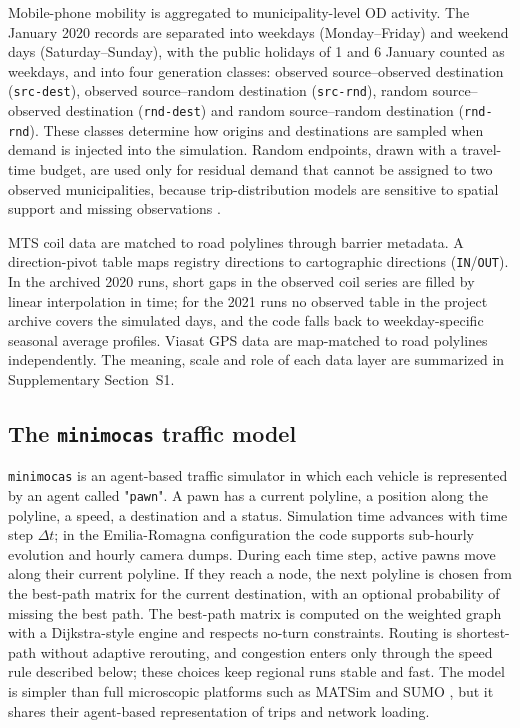 \documentclass[pdflatex,Numbered]{sn-jnl}
\begin{document}
Mobile-phone mobility is aggregated to municipality-level OD activity. The January 2020 records are separated into weekdays (Monday--Friday) and weekend days (Saturday--Sunday), with the public holidays of 1 and 6 January counted as weekdays, and into four generation classes: observed source--observed destination (\texttt{src-dest}), observed source--random destination (\texttt{src-rnd}), random source--observed destination (\texttt{rnd-dest}) and random source--random destination (\texttt{rnd-rnd}). These classes determine how origins and destinations are sampled when demand is injected into the simulation. Random endpoints, drawn with a travel-time budget, are used only for residual demand that cannot be assigned to two observed municipalities, because trip-distribution models are sensitive to spatial support and missing observations
\cite{halas2014,lenormand2016,aste2015,little2019}.

MTS coil data are matched to road polylines through barrier metadata. A direction-pivot table maps registry directions to cartographic directions (\texttt{IN}/\texttt{OUT}). In the archived 2020 runs, short gaps in the observed coil series are filled by linear interpolation in time; for the 2021 runs no observed table in the project archive covers the simulated days, and the code falls back to weekday-specific seasonal average profiles. Viasat GPS data are map-matched to road polylines independently. The meaning, scale and role of each data layer are summarized in Supplementary Section~S1.

\subsection{The \texttt{minimocas} traffic model}

\texttt{minimocas} is an agent-based traffic simulator in which each vehicle
is represented by an agent called "\texttt{pawn}". A pawn has a current polyline, a position along the polyline, a speed, a destination and a status. Simulation time advances with time step $\Delta t$; in the Emilia-Romagna configuration the code supports sub-hourly evolution and hourly camera dumps. During each time step, active pawns move along their current polyline. If they reach a node, the next polyline is chosen from the best-path matrix for the current destination, with an optional probability of missing the best path. The best-path matrix is computed on the weighted graph with a Dijkstra-style engine and respects no-turn constraints. Routing is shortest-path without adaptive rerouting, and congestion enters only through the speed rule described below; these choices keep regional runs stable and fast. The model is simpler than full microscopic platforms such as MATSim and SUMO
\cite{horni2016,lopez2018}, but it shares their agent-based representation
of trips and network loading.
\end{document}
